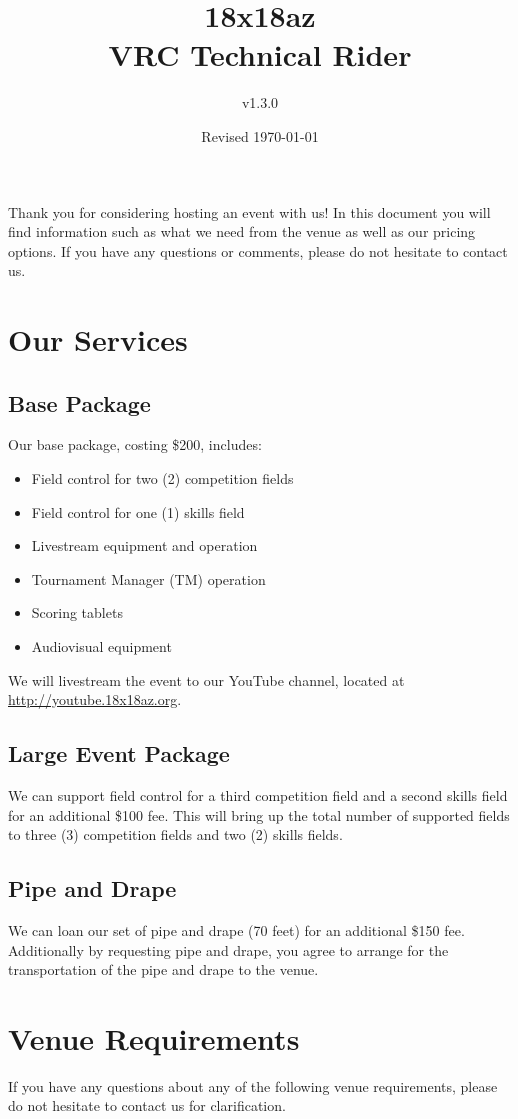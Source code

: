 \documentclass[12pt]{article}
\title{18x18az\\VRC Technical Rider}
\author{v1.3.0}
\date{Revised \today}
\begin{document}
\maketitle
Thank you for considering hosting an event with us!
In this document you will find information such as what we need from the venue as well as our pricing options.
If you have any questions or comments, please do not hesitate to contact us.
\tableofcontents
\pagebreak
\section{Our Services}
\subsection{Base Package}
Our base package, costing \$200, includes:
\begin{itemize}
    \item Field control for two (2) competition fields
    \item Field control for one (1) skills field
    \item Livestream equipment and operation
    \item Tournament Manager (TM) operation
    \item Scoring tablets
    \item Audiovisual equipment
\end{itemize}

\noindent We will livestream the event to our YouTube channel, located at \\\url{http://youtube.18x18az.org}.

\subsection{Large Event Package}
We can support field control for a third competition field and a second skills field for an additional \$100 fee.
This will bring up the total number of supported fields to three (3) competition fields and two (2) skills fields.

\subsection{Pipe and Drape}
We can loan our set of pipe and drape (70 feet) for an additional \$150 fee.
Additionally by requesting pipe and drape, you agree to arrange for the transportation of the pipe and drape to the venue.

\section{Venue Requirements}
If you have any questions about any of the following venue requirements, please do not hesitate to contact us for clarification.
\end{document}
